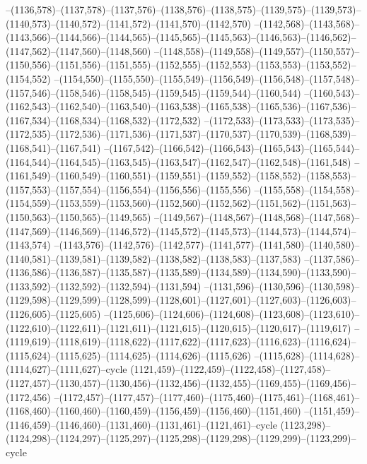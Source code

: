 --(1136,578)--(1137,578)--(1137,576)--(1138,576)--(1138,575)--(1139,575)--(1139,573)--(1140,573)--(1140,572)--(1141,572)--(1141,570)--(1142,570)
--(1142,568)--(1143,568)--(1143,566)--(1144,566)--(1144,565)--(1145,565)--(1145,563)--(1146,563)--(1146,562)--(1147,562)--(1147,560)--(1148,560)
--(1148,558)--(1149,558)--(1149,557)--(1150,557)--(1150,556)--(1151,556)--(1151,555)--(1152,555)--(1152,553)--(1153,553)--(1153,552)--(1154,552)
--(1154,550)--(1155,550)--(1155,549)--(1156,549)--(1156,548)--(1157,548)--(1157,546)--(1158,546)--(1158,545)--(1159,545)--(1159,544)--(1160,544)
--(1160,543)--(1162,543)--(1162,540)--(1163,540)--(1163,538)--(1165,538)--(1165,536)--(1167,536)--(1167,534)--(1168,534)--(1168,532)--(1172,532)
--(1172,533)--(1173,533)--(1173,535)--(1172,535)--(1172,536)--(1171,536)--(1171,537)--(1170,537)--(1170,539)--(1168,539)--(1168,541)--(1167,541)
--(1167,542)--(1166,542)--(1166,543)--(1165,543)--(1165,544)--(1164,544)--(1164,545)--(1163,545)--(1163,547)--(1162,547)--(1162,548)--(1161,548)
--(1161,549)--(1160,549)--(1160,551)--(1159,551)--(1159,552)--(1158,552)--(1158,553)--(1157,553)--(1157,554)--(1156,554)--(1156,556)--(1155,556)
--(1155,558)--(1154,558)--(1154,559)--(1153,559)--(1153,560)--(1152,560)--(1152,562)--(1151,562)--(1151,563)--(1150,563)--(1150,565)--(1149,565)
--(1149,567)--(1148,567)--(1148,568)--(1147,568)--(1147,569)--(1146,569)--(1146,572)--(1145,572)--(1145,573)--(1144,573)--(1144,574)--(1143,574)
--(1143,576)--(1142,576)--(1142,577)--(1141,577)--(1141,580)--(1140,580)--(1140,581)--(1139,581)--(1139,582)--(1138,582)--(1138,583)--(1137,583)
--(1137,586)--(1136,586)--(1136,587)--(1135,587)--(1135,589)--(1134,589)--(1134,590)--(1133,590)--(1133,592)--(1132,592)--(1132,594)--(1131,594)
--(1131,596)--(1130,596)--(1130,598)--(1129,598)--(1129,599)--(1128,599)--(1128,601)--(1127,601)--(1127,603)--(1126,603)--(1126,605)--(1125,605)
--(1125,606)--(1124,606)--(1124,608)--(1123,608)--(1123,610)--(1122,610)--(1122,611)--(1121,611)--(1121,615)--(1120,615)--(1120,617)--(1119,617)
--(1119,619)--(1118,619)--(1118,622)--(1117,622)--(1117,623)--(1116,623)--(1116,624)--(1115,624)--(1115,625)--(1114,625)--(1114,626)--(1115,626)
--(1115,628)--(1114,628)--(1114,627)--(1111,627)--cycle
(1121,459)--(1122,459)--(1122,458)--(1127,458)--(1127,457)--(1130,457)--(1130,456)--(1132,456)--(1132,455)--(1169,455)--(1169,456)--(1172,456)
--(1172,457)--(1177,457)--(1177,460)--(1175,460)--(1175,461)--(1168,461)--(1168,460)--(1160,460)--(1160,459)--(1156,459)--(1156,460)--(1151,460)
--(1151,459)--(1146,459)--(1146,460)--(1131,460)--(1131,461)--(1121,461)--cycle
(1123,298)--(1124,298)--(1124,297)--(1125,297)--(1125,298)--(1129,298)--(1129,299)--(1123,299)--cycle
